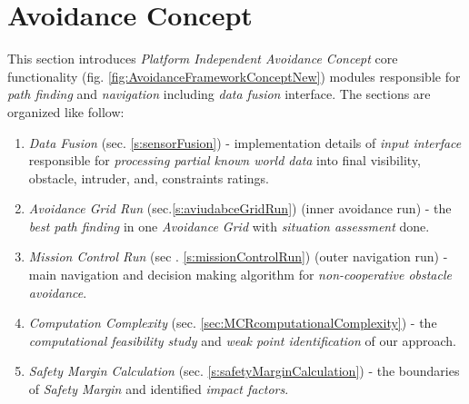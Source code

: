 \cleardoublepage
\section{Avoidance Concept}\label{s:avoidanceConcept}
This section introduces \emph{Platform Independent Avoidance Concept} core functionality (fig. \ref{fig:AvoidanceFrameworkConceptNew}) modules responsible for \emph{path finding} and \emph{navigation} including \emph{data fusion} interface. The sections are organized like follow:

\begin{enumerate}
    \item \emph{Data Fusion} (sec. \ref{s:sensorFusion}) - implementation details of \emph{input interface} responsible for \emph{processing partial known world data} into final visibility, obstacle, intruder, and, constraints ratings.
    
    \item \emph{Avoidance Grid Run} (sec.\ref{s:aviudabceGridRun}) (inner avoidance run) - the \emph{best path finding} in one \emph{Avoidance Grid} with \emph{situation assessment} done.
    
    \item \emph{Mission Control Run} (sec . \ref{s:missionControlRun}) (outer navigation run) - main navigation and decision making algorithm for \emph{non-cooperative obstacle avoidance}.
    
    \item \emph{Computation Complexity} (sec. \ref{sec:MCRcomputationalComplexity}) - the \emph{computational feasibility study} and \emph{weak point identification} of our approach.
    
    \item \emph{Safety Margin Calculation} (sec. \ref{s:safetyMarginCalculation}) - the boundaries of \emph{Safety Margin} and identified \emph{impact factors}.
\end{enumerate}
